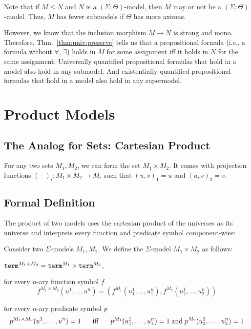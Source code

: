 Note that if $M\leq N$ and $N$ is a $(\Sigma;\Theta)$-model, then $M$ may or not be a $(\Sigma;\Theta)$-model.
Thus, $M$ has fewer submodels if $\Theta$ has more axioms.

However, we know that the inclusion morphism $M\to N$ is strong and mono.
Therefore, Thm.~\ref{thm:univ:preserve} tells us that a propositional formula (i.e., a formula without $\forall$, $\exists$) holds in $M$ for some assignment iff it holds in $N$ for the same assignment.
Universally quantified propositional formulas that hold in a model also hold in any submodel.
And existentially quantified propositional formulas that hold in a model also hold in any supermodel.

\section{Product Models}\label{sec:univ:prod}

\subsection{The Analog for Sets: Cartesian Product}

For any two sets $M_1,M_2$, we can form the set $M_1\times M_2$.
It comes with projection functions $(-)_i:M_1\times M_2\to M_i$ such that $(u,v)_1=u$ and $(u,v)_2=v$.

\subsection{Formal Definition}

The product of two models uses the cartesian product of the universes as its universe and interprets every function and predicate symbol component-wise:

\begin{definition}
Consider two $\Sigma$-models $M_1, M_2$.
We define the $\Sigma$-model $M_1\times M_2$ as follows:
\begin{compactitem}
\item $\mathtt{term}^{M_1\times M_2}=\mathtt{term}^{M_1}\times\mathtt{term}^{M_2}$,
\item for every $n$-ary function symbol $f$
 \[f^{M_1\times M_2}(u^1,\ldots,u^n)=(f^{M_1}(u^1_1,\ldots,u^n_1),f^{M_2}(u^1_2,\ldots,u^n_2))\]
\item for every $n$-ary predicate symbol $p$
 \[p^{M_1\times M_2}(u^1,\ldots,u^n)=1 \hspace*{.5cm}\;\mathrm{iff}\;\hspace*{.5cm} p^{M_1}(u^1_1,\ldots,u^n_1)=1 \;\mathrm{and}\; p^{M_2}(u^1_2,\ldots,u^n_2)=1\]
\end{compactitem}
\end{definition}

